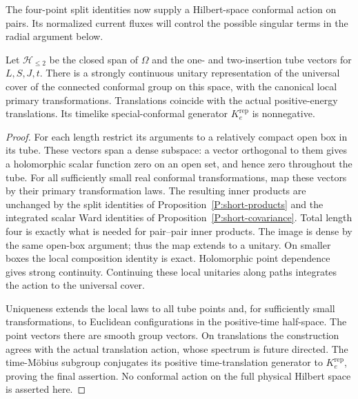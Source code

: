 The four-point split identities now supply a Hilbert-space conformal
action on pairs. Its normalized current fluxes will control the possible
singular terms in the radial argument below.

\begin{proposition}
\label{P:pair-representation}
Let $\mathcal H_{\leq2}$ be the closed span of $\Omega$ and the one- and
two-insertion tube vectors for $L,S,J,t$.  There is a strongly
continuous unitary representation of the universal cover of the
connected conformal group on this space, with the canonical local
primary transformations.  Translations coincide with the actual
positive-energy translations.  Its timelike special-conformal
generator $K_e^{\mathrm{rep}}$ is nonnegative.
\end{proposition}

\begin{proof}
For each length restrict its arguments to a relatively compact open
box in its tube.  These vectors span a dense subspace: a vector
orthogonal to them gives a holomorphic scalar function zero on an
open set, and hence zero throughout the tube.  For all sufficiently
small real conformal transformations, map these vectors by their
primary transformation laws.  The resulting inner products are
unchanged by the split identities of
Proposition~\ref{P:short-products} and the integrated scalar Ward
identities of Proposition~\ref{P:short-covariance}.  Total length four
is exactly what is needed for pair--pair inner products.  The image
is dense by the same open-box argument; thus the map extends to a
unitary.  On smaller boxes the local composition identity is exact.
Holomorphic point dependence gives strong continuity.  Continuing
these local unitaries along paths integrates the action to the
universal cover.

Uniqueness extends the local laws to all tube points and, for
sufficiently small transformations, to Euclidean configurations in
the positive-time half-space.  The point vectors there are smooth
group vectors.  On translations the construction agrees with the
actual translation action, whose spectrum is future directed.  The
time-M\"obius subgroup conjugates its positive time-translation
generator to $K_e^{\mathrm{rep}}$, proving the final assertion.  No
conformal action on the full physical Hilbert space is asserted here.
\end{proof}

